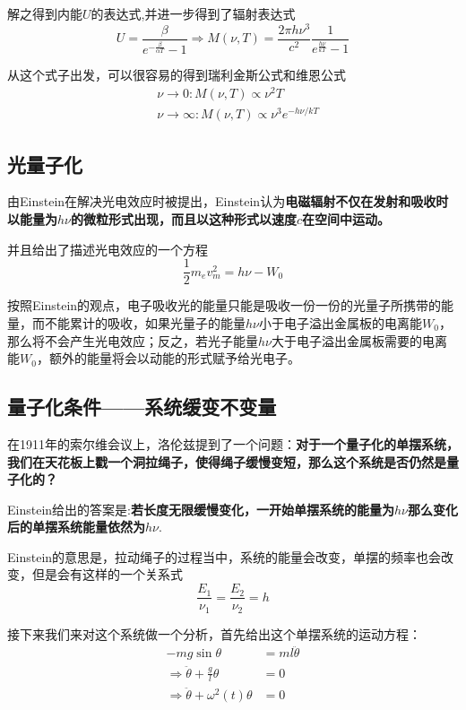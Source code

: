\documentclass{article}
\begin{document}
解之得到内能$U$的表达式,并进一步得到了辐射表达式
\begin{equation*}
	U =\frac{\beta}{e^{-\frac{\beta}{\alpha T}}-1}\Rightarrow M(\nu,T)=\frac{2\pi h\nu^3}{c^2}\frac{1}{e^{\frac{h\nu}{kT}}-1}
\end{equation*}

从这个式子出发，可以很容易的得到瑞利金斯公式和维恩公式
\begin{align*}
	 & \nu\to0:      M(\nu,T)\propto\nu^2T            \\
	 & \nu\to\infty: M(\nu,T)\propto\nu^3e^{-h\nu/kT}
\end{align*}







\subsection{光量子化}
由Einstein在解决光电效应时被提出，Einstein认为\textbf{电磁辐射不仅在发射和吸收时以能量为}$h\nu$\textbf{的微粒形式出现，而且以这种形式以速度}$c$\textbf{在空间中运动。}

并且给出了描述光电效应的一个方程
\[\frac{1}{2}m_ev_m^2=h\nu-W_0\]

按照Einstein的观点，电子吸收光的能量只能是吸收一份一份的光量子所携带的能量，而不能累计的吸收，如果光量子的能量$h\nu$小于电子溢出金属板的电离能$W_0$，那么将不会产生光电效应；反之，若光子能量$h\nu$大于电子溢出金属板需要的电离能$W_0$，额外的能量将会以动能的形式赋予给光电子。



\subsection{量子化条件——系统缓变不变量}
在1911年的索尔维会议上，洛伦兹提到了一个问题：\textbf{对于一个量子化的单摆系统，我们在天花板上戳一个洞拉绳子，使得绳子缓慢变短，那么这个系统是否仍然是量子化的？}

Einstein给出的答案是:\textbf{若长度无限缓慢变化，一开始单摆系统的能量为}$h\nu$\textbf{那么变化后的单摆系统能量依然为}$h\nu$.

Einstein的意思是，拉动绳子的过程当中，系统的能量会改变，单摆的频率也会改变，但是会有这样的一个关系式
\[\frac{E_1}{\nu_1}=\frac{E_2}{\nu_2}=h\]

接下来我们来对这个系统做一个分析，首先给出这个单摆系统的运动方程：
\begin{align*}
	-mg\sin\theta                              & =ml\ddot{\theta} \\
	\Rightarrow\ddot{\theta}+\frac{g}{l}\theta & = 0              \\
	\Rightarrow\ddot{\theta}+\omega^2(t)\theta & = 0
\end{align*}
\end{document}
